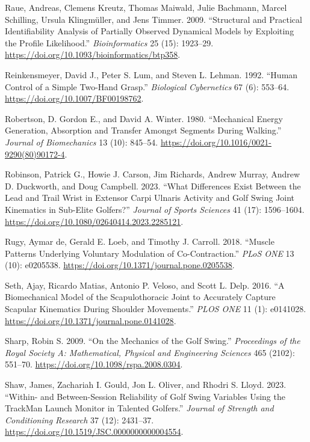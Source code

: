 \documentclass[
  letterpaper,
]{report}
\newlength{\cslhangindent}
\newenvironment{CSLReferences}[2] %
 {\begin{list}{}{%
  \setlength{\itemindent}{0pt}
  \setlength{\leftmargin}{0pt}
  \setlength{\parsep}{0pt}
  \ifodd #1
   \setlength{\leftmargin}{\cslhangindent}
   \setlength{\itemindent}{-1\cslhangindent}
  \fi
  \setlength{\itemsep}{#2\baselineskip}}}
 {\end{list}}
\begin{document}
\begin{CSLReferences}{1}{0}
Raue, Andreas, Clemens Kreutz, Thomas Maiwald, Julie Bachmann, Marcel
Schilling, Ursula Klingmüller, and Jens Timmer. 2009. {``Structural and
Practical Identifiability Analysis of Partially Observed Dynamical
Models by Exploiting the Profile Likelihood.''} \emph{Bioinformatics} 25
(15): 1923--29. \url{https://doi.org/10.1093/bioinformatics/btp358}.

Reinkensmeyer, David J., Peter S. Lum, and Steven L. Lehman. 1992.
{``Human Control of a Simple Two-Hand Grasp.''} \emph{Biological
Cybernetics} 67 (6): 553--64. \url{https://doi.org/10.1007/BF00198762}.

Robertson, D. Gordon E., and David A. Winter. 1980. {``Mechanical Energy
Generation, Absorption and Transfer Amongst Segments During Walking.''}
\emph{Journal of Biomechanics} 13 (10): 845--54.
\url{https://doi.org/10.1016/0021-9290(80)90172-4}.

Robinson, Patrick G., Howie J. Carson, Jim Richards, Andrew Murray,
Andrew D. Duckworth, and Doug Campbell. 2023. {``What Differences Exist
Between the Lead and Trail Wrist in Extensor Carpi Ulnaris Activity and
Golf Swing Joint Kinematics in Sub-Elite Golfers?''} \emph{Journal of
Sports Sciences} 41 (17): 1596--1604.
\url{https://doi.org/10.1080/02640414.2023.2285121}.

Rugy, Aymar de, Gerald E. Loeb, and Timothy J. Carroll. 2018. {``Muscle
Patterns Underlying Voluntary Modulation of Co-Contraction.''}
\emph{PLoS ONE} 13 (10): e0205538.
\url{https://doi.org/10.1371/journal.pone.0205538}.

Seth, Ajay, Ricardo Matias, Antonio P. Veloso, and Scott L. Delp. 2016.
{``A Biomechanical Model of the Scapulothoracic Joint to Accurately
Capture Scapular Kinematics During Shoulder Movements.''} \emph{PLOS
ONE} 11 (1): e0141028.
\url{https://doi.org/10.1371/journal.pone.0141028}.

Sharp, Robin S. 2009. {``On the Mechanics of the Golf Swing.''}
\emph{Proceedings of the Royal Society A: Mathematical, Physical and
Engineering Sciences} 465 (2102): 551--70.
\url{https://doi.org/10.1098/rspa.2008.0304}.

Shaw, James, Zachariah I. Gould, Jon L. Oliver, and Rhodri S. Lloyd.
2023. {``Within- and Between-Session Reliability of Golf Swing Variables
Using the {TrackMan} Launch Monitor in Talented Golfers.''}
\emph{Journal of Strength and Conditioning Research} 37 (12): 2431--37.
\url{https://doi.org/10.1519/JSC.0000000000004554}.


\end{CSLReferences}
\end{document}
